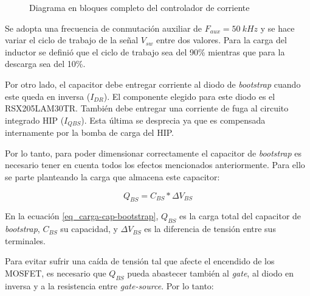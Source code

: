 \begin{figure}[H]
	\centering
	\scalebox{0.8}{}
	\caption{Diagrama en bloques completo del controlador de corriente}	\label{fig:img_diag-en-bloques-con-oscilador}
\end{figure}

\noindent Se adopta una frecuencia de conmutación auxiliar de $F_{aux}=50\:kHz$ y se hace variar el ciclo de trabajo de la señal $V_{sw}$ entre dos valores. Para la carga del inductor se definió que el ciclo de trabajo sea del 90\% mientras que para la descarga sea del 10\%.

%



\noindent Por otro lado, el capacitor debe entregar corriente al diodo de \textsl{bootstrap} cuando este queda en inversa ($I_{DR}$). El componente elegido para este diodo es el RSX205LAM30TR. También debe entregar una corriente de fuga al circuito integrado HIP ($I_{QBS}$). Esta última se desprecia ya que es compensada internamente por la bomba de carga del HIP.

\noindent Por lo tanto, para poder dimensionar correctamente el capacitor de \textsl{bootstrap} es necesario tener en cuenta todos los efectos mencionados anteriormente. Para ello se parte planteando la carga que almacena este capacitor:

\begin{equation} \label{eq_carga-cap-bootstrap}
	Q_{BS}=C_{BS}*\Delta V_{BS}
\end{equation}

\noindent En la ecuación \ref{eq_carga-cap-bootstrap}, $Q_{BS}$ es la carga total del capacitor de \textsl{bootstrap}, $C_{BS}$ su capacidad, y $\Delta V_{BS}$ es la diferencia de  tensión entre sus terminales. 

\noindent Para evitar sufrir una caída de tensión tal que afecte el encendido de los MOSFET, es necesario que $Q_{BS}$ pueda abastecer también al \textsl{gate}, al diodo en inversa y a la resistencia entre \textsl{gate-source}. Por lo tanto:


